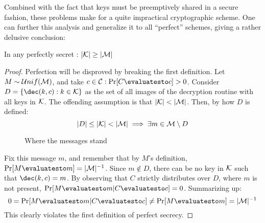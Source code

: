 
Combined with the fact that keys must be preemptively shared in a secure fashion, these problems make for a quite impractical cryptographic scheme. One can further this analysis and generalize it to all ``perfect'' schemes, giving a rather delusive conclusion:

\begin{theorem}
    In any perfectly secret \ske{}: $|\mathcal{K}| \geq |\mathcal{M}|$
\end{theorem}
\begin{proof}
    Perfection will be disproved by breaking the first definition. Let $M \sim \mathcal{U}nif(\mathcal{M})$, and take $c \in \C : \Pr[C \evaluatesto c] > 0$. Consider $D = \{\dec(k, c) : k \in \K\}$ as the set of all images of the decryption routine with all keys in $\mathcal{K}$. The offending assumption is that $|\mathcal{K}| < |\mathcal{M}|$. Then, by how $D$ is defined:
    \[
        |D| \leq |\mathcal{K}| < |\mathcal{M}| \implies \exists m \in \mathcal{M} \setminus D
    \]

    \begin{figure}[h]
        \centering
        \def\firstcircle{(0,0) circle (1.5cm)}
        \def\secondcircle{(60:0) circle (0.9cm)}
        \caption{Where the messages stand}
    \end{figure}

    Fix this message $m$, and remember that by $M$'s definition, $\Pr[M \evaluatesto m] = |\M|^{-1}$. Since $m \notin D$, there can be no key in $\mathcal{K}$ such that $\dec(k, c) = m$. By observing that $C$ strictly distributes over $D$, where $m$ is not present, $\Pr[M \evaluatesto m|C \evaluatesto c] = 0$. Summarizing up:
    \[
        0 = \Pr[M \evaluatesto m|C \evaluatesto c] \neq \Pr[M \evaluatesto m] = |\M|^{-1}
    \]
    This clearly violates the first definition of perfect secrecy.
\end{proof}
